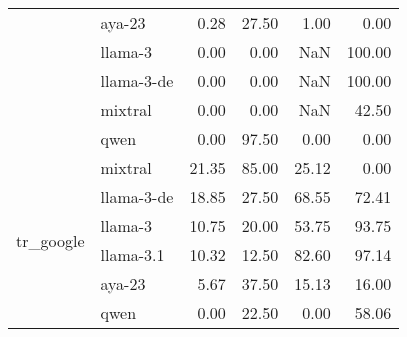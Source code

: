 \begin{tabular}{llrrrr}
 & aya-23 & 0.28 & 27.50 & 1.00 & 0.00 \\
 & llama-3 & 0.00 & 0.00 & NaN & 100.00 \\
 & llama-3-de & 0.00 & 0.00 & NaN & 100.00 \\
 & mixtral & 0.00 & 0.00 & NaN & 42.50 \\
 & qwen & 0.00 & 97.50 & 0.00 & 0.00 \\
\cline{1-6}
\multirow[t]{6}{*}{tr_google} & mixtral & 21.35 & 85.00 & 25.12 & 0.00 \\
 & llama-3-de & 18.85 & 27.50 & 68.55 & 72.41 \\
 & llama-3 & 10.75 & 20.00 & 53.75 & 93.75 \\
 & llama-3.1 & 10.32 & 12.50 & 82.60 & 97.14 \\
 & aya-23 & 5.67 & 37.50 & 15.13 & 16.00 \\
 & qwen & 0.00 & 22.50 & 0.00 & 58.06 \\
\cline{1-6}
\bottomrule
\end{tabular}
